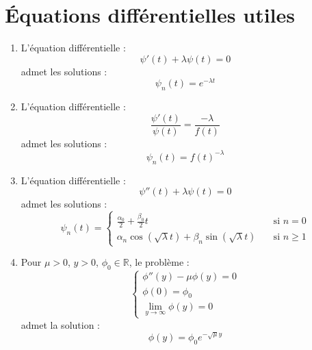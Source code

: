 \section{Équations différentielles utiles}
\begin{enumerate}
    \item L'équation différentielle :
    $$\psi'(t) + \lambda \psi(t) = 0$$
    admet les solutions :
    $$\psi_n(t) = e^{-\lambda t}$$
    \item L'équation différentielle :
    $$\frac{\psi'(t)}{\psi(t)} = \frac{-\lambda}{f(t)}$$
    admet les solutions :
    $$\psi_n(t) = f(t)^{-\lambda}$$
    \item L'équation différentielle :
    $$\psi''(t) + \lambda \psi(t) = 0$$
    admet les solutions :
    $$\psi_n(t) = 
    \begin{cases}
        \frac{\alpha_0}{2} + \frac{\beta_0}{2}t &\text{si } n = 0 \\
        \alpha_n \cos(\sqrt{\lambda}t) + \beta_n \sin(\sqrt{\lambda}t) \quad &\text{si } n \geq 1
    \end{cases}$$
    \item Pour $\mu > 0$, $y > 0$, $\phi_0 \in \mathbb{R}$, le problème :
    $$\begin{cases}
        \phi''(y) - \mu \phi(y) = 0 \\
        \phi(0) = \phi_0 \\
        \lim_{y \to \infty} \phi(y) = 0
    \end{cases}$$
    admet la solution :
    $$\phi(y) = \phi_0 e^{-\sqrt{\mu}y}$$
\end{enumerate}
